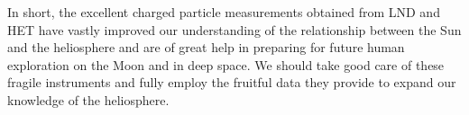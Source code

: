 In short, the excellent charged particle measurements obtained from \ac{LND} and \ac{HET} have vastly improved our understanding of the relationship between the Sun and the heliosphere and are of great help in preparing for future human exploration on the Moon and in deep space. We should take good care of these fragile instruments and fully employ the fruitful data they provide to expand our knowledge of the heliosphere.





 








